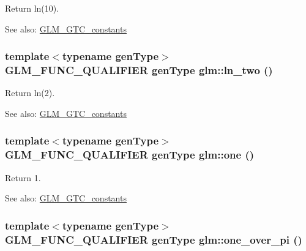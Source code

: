 Return ln(10). \begin{Desc}
\item[See also:]\hyperlink{group__gtc__constants}{GLM\_\-GTC\_\-constants} \end{Desc}
\hypertarget{group__gtc__constants_g1d237e2d94b69cdf1122ae8cbb561b2d}{
\subsubsection[ln\_\-two]{\setlength{\rightskip}{0pt plus 5cm}template$<$typename genType$>$ GLM\_\-FUNC\_\-QUALIFIER genType glm::ln\_\-two ()}}
\label{group__gtc__constants_g1d237e2d94b69cdf1122ae8cbb561b2d}


Return ln(2). \begin{Desc}
\item[See also:]\hyperlink{group__gtc__constants}{GLM\_\-GTC\_\-constants} \end{Desc}
\hypertarget{group__gtc__constants_gbc71dfc97639e8010a39c1892e68ed9b}{
\subsubsection[one]{\setlength{\rightskip}{0pt plus 5cm}template$<$typename genType$>$ GLM\_\-FUNC\_\-QUALIFIER genType glm::one ()}}
\label{group__gtc__constants_gbc71dfc97639e8010a39c1892e68ed9b}


Return 1. \begin{Desc}
\item[See also:]\hyperlink{group__gtc__constants}{GLM\_\-GTC\_\-constants} \end{Desc}
\hypertarget{group__gtc__constants_gcbd54875746accf5c4c5a52582c8d764}{
\subsubsection[one\_\-over\_\-pi]{\setlength{\rightskip}{0pt plus 5cm}template$<$typename genType$>$ GLM\_\-FUNC\_\-QUALIFIER genType glm::one\_\-over\_\-pi ()}}
\label{group__gtc__constants_gcbd54875746accf5c4c5a52582c8d764}


